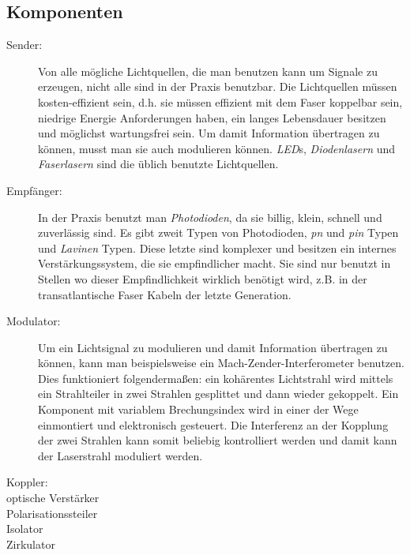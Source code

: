 \documentclass[a4paper]{article}
\begin{document}
\subsection{Komponenten}
\begin{description}
  \item[Sender:]
    Von alle mögliche Lichtquellen, die man benutzen kann um Signale zu
    erzeugen, nicht alle sind in der Praxis benutzbar. Die Lichtquellen müssen
    kosten-effizient sein, d.h. sie müssen effizient mit dem Faser koppelbar
    sein, niedrige Energie Anforderungen haben, ein langes Lebensdauer besitzen
    und möglichst wartungsfrei sein. Um damit Information übertragen zu können,
    musst man sie auch modulieren können. \emph{LED}s, \emph{Diodenlasern} und
    \emph{Faserlasern} sind die üblich benutzte Lichtquellen.

  \item[Empfänger:]
    In der Praxis benutzt man \emph{Photodioden}, da sie billig, klein, schnell
    und zuverlässig sind. Es gibt zweit Typen von Photodioden, \emph{pn} und
    \emph{pin} Typen und \emph{Lavinen} Typen. Diese letzte sind komplexer und
    besitzen ein internes Verstärkungssystem, die sie empfindlicher macht. Sie
    sind nur benutzt in Stellen wo dieser Empfindlichkeit wirklich benötigt
    wird, z.B. in der transatlantische Faser Kabeln der letzte Generation. 

  \item[Modulator:]
    Um ein Lichtsignal zu modulieren und damit Information übertragen zu
    können, kann man beispielsweise ein Mach-Zender-Interferometer benutzen.
    Dies funktioniert folgendermaßen: ein kohärentes Lichtstrahl wird mittels
    ein Strahlteiler in zwei Strahlen gesplittet und dann wieder gekoppelt. Ein
    Komponent mit variablem Brechungsindex wird in einer der Wege einmontiert
    und elektronisch gesteuert. Die Interferenz an der Kopplung der zwei
    Strahlen kann somit beliebig kontrolliert werden und damit kann der
    Laserstrahl moduliert werden.

  \item[Koppler:]
    
  \item[optische Verstärker]
  \item[Polarisationssteiler]
  \item[Isolator]
  \item[Zirkulator]


\end{description}
\end{document}
